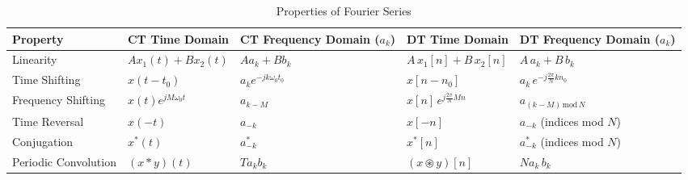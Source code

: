 \documentclass{article}
\begin{document}
\begin{multicols}{2}
    \begin{table*}[ht]
        \centering
        \caption{Properties of Fourier Series}
        \label{tab:fourier_series_properties}
        \small
        \begin{tabular}{@{}lllll@{}}
            \toprule
            \textbf{Property}    & \textbf{CT Time Domain}                               & \textbf{CT Frequency Domain} ($a_k$)                            & \textbf{DT Time Domain}                       & \textbf{DT Frequency Domain} ($a_k$)                                       \\
            \midrule
            Linearity            & $A x_1(t) + B x_2(t)$                                 & $A a_k + B b_k$                                                 & $A\,x_1[n] + B\,x_2[n]$                       & $A\,a_k + B\,b_k$                                                          \\ [1mm]
            Time Shifting        & $x(t - t_0)$                                          & $a_k e^{-j k \omega_0 t_0}$                                     & $x[n-n_0]$                                    & $a_k\,e^{-j\frac{2\pi}{N} k n_0}$                                          \\ [1mm]
            Frequency Shifting   & $x(t) e^{j M \omega_0 t}$                             & $a_{k - M}$                                                     & $x[n]\,e^{j\frac{2\pi}{N} M n}$               & $a_{(k-M)\,\mathrm{mod}\,N}$                                               \\ [1mm]
            Time Reversal        & $x(-t)$                                               & $a_{-k}$                                                        & $x[-n]$                                       & $a_{-k}$ (indices mod $N$)                                                 \\ [1mm]
            Conjugation          & $x^*(t)$                                              & $a_{-k}^*$                                                      & $x^*[n]$                                      & $a^*_{-k}$ (indices mod $N$)                                               \\ [1mm]
            Periodic Convolution & $(x \ast y)(t)$                                       & $T a_k b_k$                                                     & $(x\circledast y)[n]$                         & $N a_k\,b_k$                                                               \\ [1mm]

\end{tabular}
\end{table*}
\end{multicols}
\end{document}

